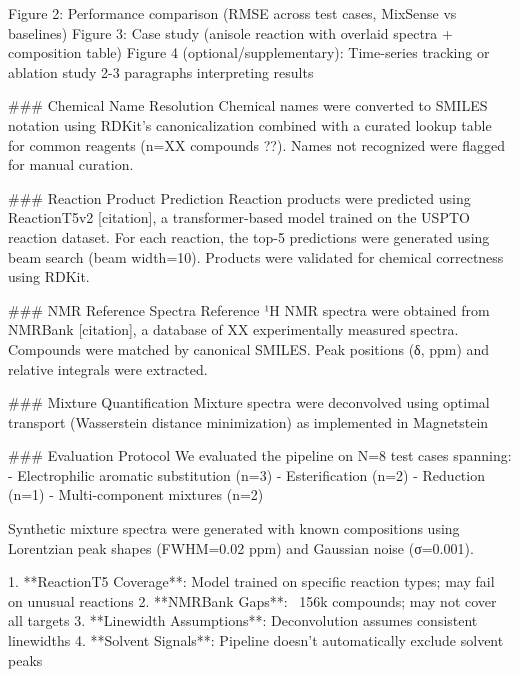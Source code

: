 \documentclass{article}
\begin{document}
Figure 2: Performance comparison (RMSE across test cases, MixSense vs baselines)
Figure 3: Case study (anisole reaction with overlaid spectra + composition table)
Figure 4 (optional/supplementary): Time-series tracking or ablation study
2-3 paragraphs interpreting results


### Chemical Name Resolution
Chemical names were converted to SMILES notation using RDKit's
canonicalization combined with a curated lookup table for common
reagents (n=XX compounds ??). Names not recognized were flagged for
manual curation.

### Reaction Product Prediction
Reaction products were predicted using ReactionT5v2 [citation],
a transformer-based model trained on the USPTO reaction dataset.
For each reaction, the top-5 predictions were generated using
beam search (beam width=10). Products were validated for chemical
correctness using RDKit.

### NMR Reference Spectra
Reference ¹H NMR spectra were obtained from NMRBank [citation],
a database of XX experimentally measured spectra. Compounds were
matched by canonical SMILES. Peak positions (δ, ppm) and relative
integrals were extracted.

### Mixture Quantification
Mixture spectra were deconvolved using optimal transport
(Wasserstein distance minimization) as implemented in Magnetstein



### Evaluation Protocol
We evaluated the pipeline on N=8 test cases spanning:
- Electrophilic aromatic substitution (n=3)
- Esterification (n=2)
- Reduction (n=1)
- Multi-component mixtures (n=2)

Synthetic mixture spectra were generated with known compositions
using Lorentzian peak shapes (FWHM=0.02 ppm) and Gaussian noise
(σ=0.001).


1. **ReactionT5 Coverage**: Model trained on specific reaction types; may fail on unusual reactions
2. **NMRBank Gaps**: ~156k compounds; may not cover all targets
3. **Linewidth Assumptions**: Deconvolution assumes consistent linewidths
4. **Solvent Signals**: Pipeline doesn't automatically exclude solvent peaks
\end{document}
